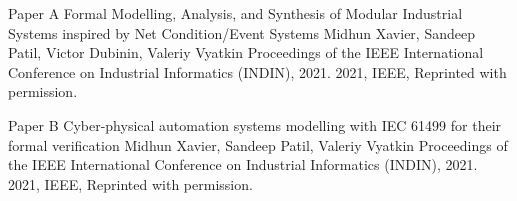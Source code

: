 \documentclass[12pt,a4paper,openright,final,twoside]{cseethesis}
\begin{document}



%
\startpapers


\def\paperheader{Paper A}
\def\papertitle{Formal Modelling, Analysis, and Synthesis of Modular Industrial Systems inspired by Net Condition/Event Systems}
\def\paperauthorstring{Midhun Xavier, Sandeep Patil, Victor Dubinin, Valeriy Vyatkin}
\def\referencestring{Proceedings of the IEEE International Conference on Industrial Informatics (INDIN), 2021.}
\def\copyrightstring{2021, IEEE, Reprinted with permission.}


\makepaperaccepted
  {\paperheader}
  {\papertitle}
  {\paperauthorstring}
  {\referencestring}
  {\copyrightstring}




\def\paperheader{Paper B}
\def\papertitle{Cyber-physical automation systems modelling with IEC 61499 for their formal verification}
\def\paperauthorstring{Midhun Xavier, Sandeep Patil, Valeriy Vyatkin}
\def\referencestring{Proceedings of the IEEE International Conference on Industrial Informatics (INDIN), 2021.}
\def\copyrightstring{2021, IEEE, Reprinted with permission.}


\makepaperaccepted
  {\paperheader}
  {\papertitle}
  {\paperauthorstring}
  {\referencestring}
  {\copyrightstring}


\def\paperheader{Paper C}
\def\papertitle{Formal verification of observers supervising a cyber-physical system implemented using IEC~61499}
\def\paperauthorstring{Polina Ovsiannikova, Etienne Le Priol, Vincent Perret, Pranay Jhunjhunwala, Midhun Xavier, and Valeriy Vyatkin}
\def\referencestring{Proceedings of the IEEE International Conference on Industrial Informatics (INDIN), 2021.}
\def\copyrightstring{2021, IEEE, Reprinted with permission.}
\end{document}
